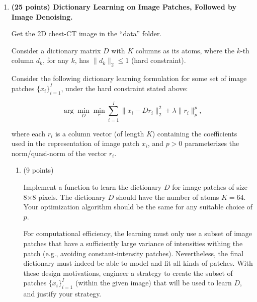 \documentclass[12pt]{article}
\begin{document}
\begin {enumerate}
\begin {enumerate}
    (iv)~Image denoised using prior-B and optimal parameter tuning,
    
    (v)~Image denoised using prior-C and optimal parameter tuning.
    
    In which of the three cases (i.e., A,B,C) do you observe edge preservation~? and why~?
    
  \item (3 points) Show the plots of the objective-function values (vertical axis) versus iteration
    (horizontal axis) corresponding to each of the 3 denoised results above.
    
  \end {enumerate}
  
  \newpage
  
\item {\bf (25 points) Dictionary Learning on Image Patches, Followed by Image Denoising.}
  
  Get the 2D chest-CT image in the ``data'' folder.
  
  Consider a dictionary matrix $D$ with $K$ columns as its atoms, where the $k$-th column $d_k$, for any $k$,
  has $\| d_k \|_2 \le 1$ (hard constraint).
  
  Consider the following dictionary learning formulation for some set of image patches $\{ x_i \}_{i=1}^I$,
  under the hard constraint stated above:
  
  $$\arg \min_D \min_r \sum_{i=1}^I \| x_i - D r_i \|_2^2 + \lambda \| r_i \|_p^p ,$$
  
  where each $r_i$ is a column vector (of length $K$) containing the coefficients used in the representation
  of image patch $x_i$, and $p > 0$ parameterizes the norm/quasi-norm of the vector $r_i$.
  
  \begin {enumerate}
  \item (9 points)
    
    Implement a function to learn the dictionary $D$ for image patches of size 8$\times$8 pixels. The
    dictionary $D$ should have the number of atoms $K = 64$. Your optimization algorithm should be the same
    for any suitable choice of $p$.
    
    For computational efficiency, the learning must only use a subset of image patches that have a
    sufficiently large variance of intensities withing the patch (e.g., avoiding constant-intensity patches).
    Nevertheless, the final dictionary must indeed be able to model and fit all kinds of patches. With these
    design motivations, engineer a strategy to create the subset of patches $\{ x_i \}_{i=1}^I$ (within the
    given image) that will be used to learn $D$, and justify your strategy.
    

\end{enumerate}
\end{enumerate}
\end{document}
